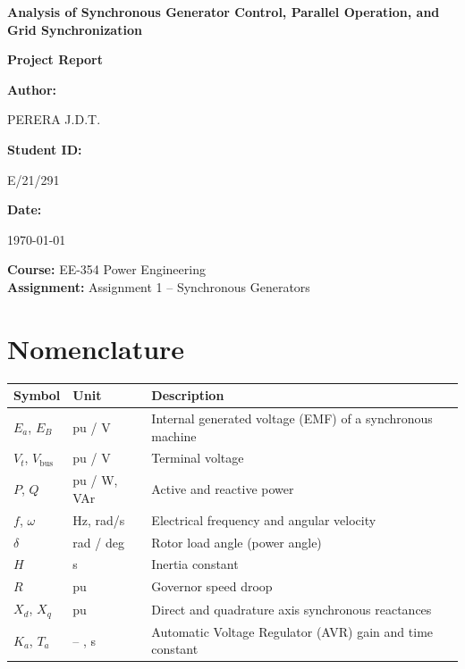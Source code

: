 \documentclass[12pt, a4paper]{article}
\begin{document}
\begin{titlepage}
    \vspace*{\fill}
    \centering
    {\Huge \textbf{Analysis of Synchronous Generator Control, Parallel Operation, and Grid Synchronization}\par}
    \vspace{1.5cm}
    {\Large \textbf{Project Report}\par}
    \vspace{2cm}
    {\Large \textbf{Author:}\par}
    {\Large PERERA J.D.T.\par}
    \vspace{0.5cm}
    {\Large \textbf{Student ID:}\par}
    {\Large E/21/291\par}
    \vspace{0.5cm}
    {\Large \textbf{Date:}\par}
    {\Large \today\par}
    
    \vspace*{\fill}
    
    \begin{center}
        \textbf{Course:} EE-354 Power Engineering \\
        \textbf{Assignment:} Assignment 1 -- Synchronous Generators
    \end{center}
\end{titlepage}

\tableofcontents
\newpage

\section*{Nomenclature}
\begin{table}[H]
    \centering
    \begin{tabular}{llp{10cm}}
        \toprule
        \textbf{Symbol} & \textbf{Unit} & \textbf{Description} \\
        \midrule
        $E_a$, $E_B$ & pu / V & Internal generated voltage (EMF) of a synchronous machine \\
        $V_t$, $V_{\text{bus}}$ & pu / V & Terminal voltage \\
        $P$, $Q$ & pu / W, VAr & Active and reactive power \\
        $f$, $\omega$ & Hz, rad/s & Electrical frequency and angular velocity \\
        $\delta$ & rad / deg & Rotor load angle (power angle) \\
        $H$ & s & Inertia constant \\
        $R$ & pu & Governor speed droop \\
        $X_d$, $X_q$ & pu & Direct and quadrature axis synchronous reactances \\
        $K_a$, $T_a$ & -- , s & Automatic Voltage Regulator (AVR) gain and time constant \\
        \bottomrule
    \end{tabular}
\end{table}
\newpage
\end{document}
